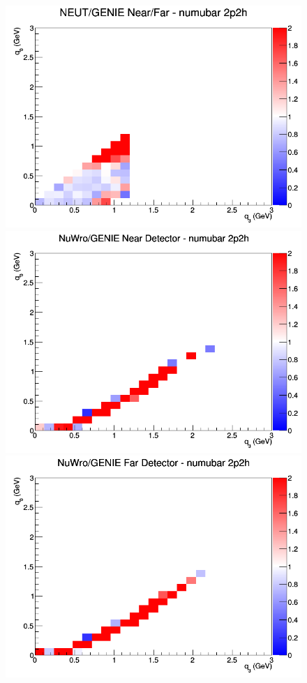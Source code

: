 \begin{figure}[h]
\endminipage
{}
\includegraphics[width=\linewidth]{q0_q3/nominal/ratios/2p2h_NEUT_GENIE_numubar_NF_q3_q0.png}
\endminipage
\newline
{}
\includegraphics[width=\linewidth]{q0_q3/nominal/ratios/2p2h_NuWro_GENIE_numubar_near_q3_q0.png}
\endminipage
{}
\includegraphics[width=\linewidth]{q0_q3/nominal/ratios/2p2h_NuWro_GENIE_numubar_far_q3_q0.png}

\end{figure}
